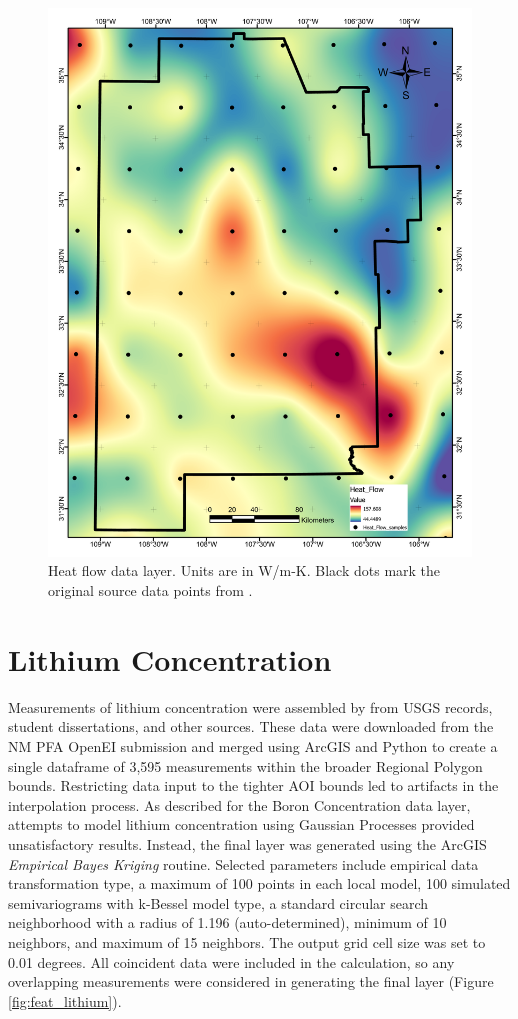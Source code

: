 \begin{figure}[H]
\centering
\includegraphics[width=0.75\linewidth]{templates/images/Figure-HeatFlow.pdf}
\caption[Heat flow data layer]{Heat flow data layer. Units are in W/m-K. Black dots mark the original source data points from \protect\citet{lucazeau_analysis_2019}.}
\label{fig:feat_heatflow}
\end{figure}
\pagebreak

\section{Lithium Concentration}\label{app:dl_lithium}
Measurements of lithium concentration were assembled by \citet{bielicki_hydrogeolgic_2015} from USGS records, student dissertations, and other sources. These data were downloaded from the NM PFA OpenEI submission \citep{kelley_geothermal_2015} and merged using ArcGIS and Python to create a single dataframe of 3,595 measurements within the broader Regional Polygon bounds. Restricting data input to the tighter AOI bounds led to artifacts in the interpolation process. As described for the Boron Concentration data layer, attempts to model lithium concentration using Gaussian Processes provided unsatisfactory results. Instead, the final layer was generated using the ArcGIS \textit{Empirical Bayes Kriging} routine. Selected parameters include empirical data transformation type, a maximum of 100 points in each local model, 100 simulated semivariograms with k-Bessel model type, a standard circular search neighborhood with a radius of 1.196 (auto-determined), minimum of 10 neighbors, and maximum of 15 neighbors. The output grid cell size was set to 0.01 degrees. All coincident data were included in the calculation, so any overlapping measurements were considered in generating the final layer (Figure \ref{fig:feat_lithium}).
\vfill
\pagebreak

